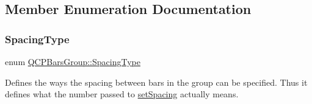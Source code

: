 \subsection{Member Enumeration Documentation}
\mbox{\label{class_q_c_p_bars_group_a4c0521120a97e60bbca37677a37075b6}} 
\subsubsection{\texorpdfstring{Spacing\+Type}{SpacingType}\hspace{0.1cm}{\footnotesize\ttfamily [1/2]}}
{\footnotesize\ttfamily enum \hyperlink{class_q_c_p_bars_group_a4c0521120a97e60bbca37677a37075b6}{Q\+C\+P\+Bars\+Group\+::\+Spacing\+Type}}

Defines the ways the spacing between bars in the group can be specified. Thus it defines what the number passed to \hyperlink{class_q_c_p_bars_group_aa553d327479d72a0c3dafcc724a190e2}{set\+Spacing} actually means.

